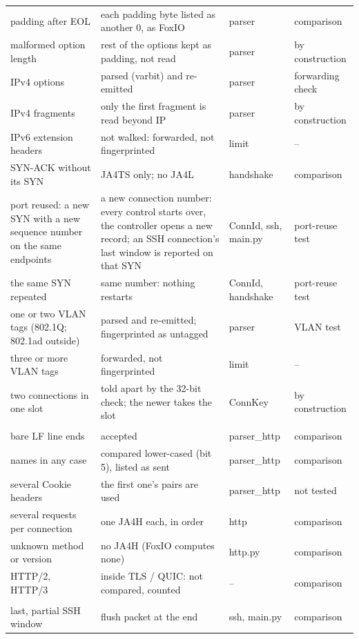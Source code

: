 {\begin{longtable}{>{\raggedright\arraybackslash}p{36mm} >{\raggedright\arraybackslash}p{70mm} >{\raggedright\arraybackslash}p{22mm} >{\raggedright\arraybackslash}p{24mm}}
padding after EOL & each padding byte listed as another 0, as FoxIO & parser & comparison \\
malformed option length & rest of the options kept as padding, not read & parser & by construction \\
IPv4 options & parsed (varbit) and re-emitted & parser & forwarding check \\
IPv4 fragments & only the first fragment is read beyond IP & parser & by construction \\
IPv6 extension headers & not walked: forwarded, not fingerprinted & limit & -- \\
SYN-ACK without its SYN & JA4TS only; no JA4L & handshake & comparison \\
port reused: a new SYN with a new sequence number on the same endpoints & a new connection number: every control starts over, the controller opens a new record; an SSH connection's last window is reported on that SYN & ConnId, ssh, main.py & port-reuse test \\
the same SYN repeated & same number: nothing restarts & ConnId, handshake & port-reuse test \\
one or two VLAN tags (802.1Q; 802.1ad outside) & parsed and re-emitted; fingerprinted as untagged & parser & VLAN test \\
three or more VLAN tags & forwarded, not fingerprinted & limit & -- \\
two connections in one slot & told apart by the 32-bit check; the newer takes the slot & ConnKey & by construction \\
\midrule
\multicolumn{4}{l}{\textit{HTTP}} \\[2pt]
bare LF line ends & accepted & parser\_http & comparison \\
names in any case & compared lower-cased (bit 5), listed as sent & parser\_http & comparison \\
several Cookie headers & the first one's pairs are used & parser\_http & not tested \\
several requests per connection & one JA4H each, in order & http & comparison \\
unknown method or version & no JA4H (FoxIO computes none) & http.py & comparison \\
HTTP/2, HTTP/3 & inside TLS / QUIC: not compared, counted & -- & comparison \\
\midrule
\multicolumn{4}{l}{\textit{SSH, DHCP}} \\[2pt]
last, partial SSH window & flush packet at the end & ssh, main.py & comparison \\

\end{longtable}}
